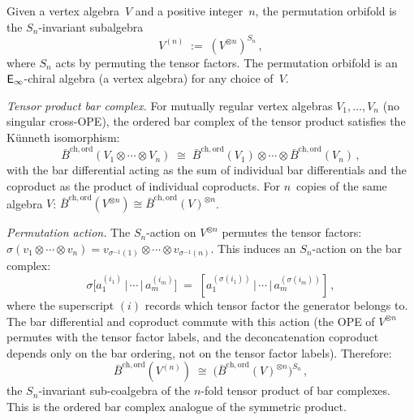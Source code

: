 Given a vertex algebra~$V$ and a positive integer~$n$,
the permutation orbifold is the $S_n$-invariant subalgebra
\begin{equation}\label{eq:perm-orbifold-def}
V^{(n)}
\;:=\;
(V^{\otimes n})^{S_n}\,,
\end{equation}
where $S_n$ acts by permuting the tensor factors.
The permutation orbifold is an $\mathsf{E}_{\infty}$-chiral algebra
(a vertex algebra) for any choice of~$V$.

\begin{computation}%
\label{comp:permutation-orbifold-bar}%
%
%
%
%

\smallskip
\noindent
\emph{Tensor product bar complex.}
For mutually regular vertex algebras $V_1, \ldots, V_n$
(no singular cross-OPE), the ordered bar complex of the
tensor product satisfies the K\"{u}nneth isomorphism:
\begin{equation}\label{eq:tensor-product-bar}
\bar{B}^{\mathrm{ch,ord}}(V_1 \otimes \cdots \otimes V_n)
\;\cong\;
\bar{B}^{\mathrm{ch,ord}}(V_1)
\otimes \cdots \otimes
\bar{B}^{\mathrm{ch,ord}}(V_n)\,,
\end{equation}
with the bar differential acting as the sum of
individual bar differentials and the coproduct as
the product of individual coproducts. For $n$~copies
of the same algebra $V$:
$\bar{B}^{\mathrm{ch,ord}}(V^{\otimes n})
\cong \bar{B}^{\mathrm{ch,ord}}(V)^{\otimes n}$.

\smallskip
\noindent
\emph{Permutation action.}
The $S_n$-action on $V^{\otimes n}$ permutes the tensor
factors: $\sigma(v_1 \otimes \cdots \otimes v_n)
= v_{\sigma^{-1}(1)} \otimes \cdots \otimes v_{\sigma^{-1}(n)}$.
This induces an $S_n$-action on the bar complex:
\begin{equation}\label{eq:perm-bar-action}
\sigma\bigl[a_1^{(i_1)} \,|\, \cdots \,|\, a_m^{(i_m)}\bigr]
\;=\;
[a_1^{(\sigma(i_1))} \,|\, \cdots \,|\, a_m^{(\sigma(i_m))}]\,,
\end{equation}
where the superscript $(i)$ records which tensor factor
the generator belongs to. The bar differential and
coproduct commute with this action (the OPE of
$V^{\otimes n}$ permutes with the tensor factor labels,
and the deconcatenation coproduct depends only on the
bar ordering, not on the tensor factor labels).
Therefore:
\begin{equation}\label{eq:perm-orbifold-bar}
\bar{B}^{\mathrm{ch,ord}}(V^{(n)})
\;\cong\;
\bigl(\bar{B}^{\mathrm{ch,ord}}(V)^{\otimes n}\bigr)^{S_n}\,,
\end{equation}
the $S_n$-invariant sub-coalgebra of the $n$-fold tensor
product of bar complexes. This is the ordered bar complex
analogue of the symmetric product.


\end{computation}
